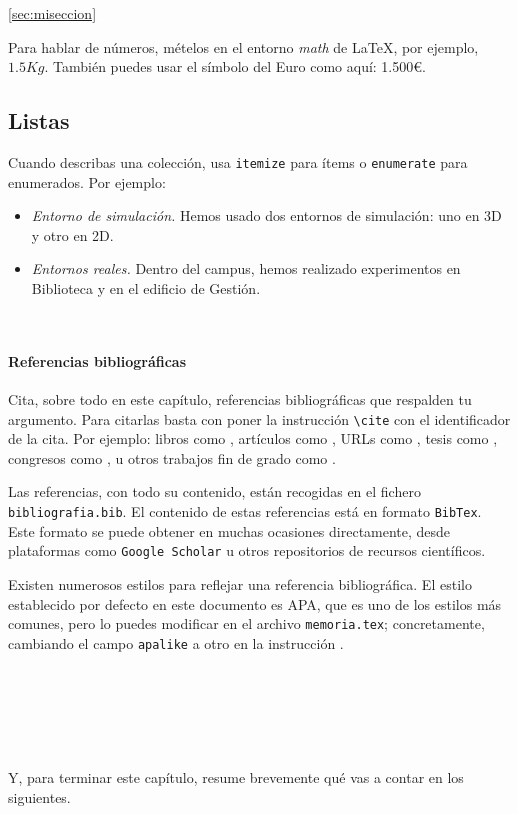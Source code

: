 \ref{sec:miseccion}

Para hablar de números, mételos en el entorno \textit{math} de \LaTeX, por ejemplo, $1.5Kg$. También puedes usar el símbolo del Euro como aquí: 1.500\euro.

\subsection{Listas}

Cuando describas una colección, usa \texttt{itemize} para ítems o \texttt{enumerate} para enumerados. Por ejemplo:

\begin{itemize}
 \item \textit{Entorno de simulación.} Hemos usado dos entornos de simulación: uno en 3D y otro en 2D.
 \item \textit{Entornos reales.} Dentro del campus, hemos realizado experimentos en Biblioteca y en el edificio de Gestión.
\end{itemize}\


\paragraph{Referencias bibliográficas}
\label{sec:referencias}

Cita, sobre todo en este capítulo, referencias bibliográficas que respalden tu argumento. Para citarlas basta con poner la instrucción \verb|\cite| con el identificador de la cita. Por ejemplo: libros como \cite{vega12e}, artículos como \cite{vega19b}, URLs como \cite{vega19a}, tesis como \cite{vega18b}, congresos como \cite{vega18a}, u otros trabajos fin de grado como \cite{vega08b}.

Las referencias, con todo su contenido, están recogidas en el fichero \texttt{bibliografia.bib}. El contenido de estas referencias está en formato \texttt{BibTex}. Este formato se puede obtener en muchas ocasiones directamente, desde plataformas como \texttt{Google Scholar} u otros repositorios de recursos científicos.

Existen numerosos estilos para reflejar una referencia bibliográfica. El estilo establecido por defecto en este documento es APA, que es uno de los estilos más comunes, pero lo puedes modificar en el archivo \texttt{memoria.tex}; concretamente, cambiando el campo \verb|apalike| a otro en la instrucción \verb||. 

\

\

\

Y, para terminar este capítulo, resume brevemente qué vas a contar en los siguientes.
